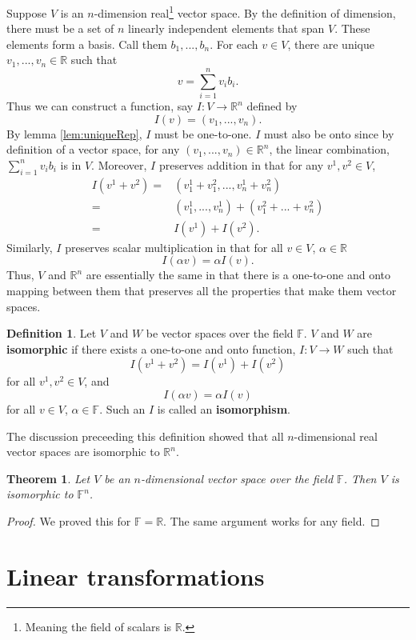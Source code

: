 \documentclass[12pt,reqno]{amsart}
\def\F{\mathbb{F}}
\def\R{\mathbb{R}}
\newtheorem{theorem}{Theorem}[section]
\theoremstyle{definition}
\newtheorem{definition}{Definition}[section]
\begin{document}
Suppose $V$ is an $n$-dimension real\footnote{Meaning the field of
  scalars is $\R$.} vector space. By the definition of dimension,
there must be a set of $n$ linearly independent elements that span
$V$. These elements form a basis. Call them $b_1, ..., b_n$. For each
$v \in V$, there are unique $v_1, ..., v_n \in \R$ such that 
\[ v = \sum_{i=1}^n v_i b_i. \]
Thus we can construct a function, say $I: V \to \R^n$ defined by 
\[ I(v) = (v_1, ..., v_n). \]
By lemma \ref{lem:uniqueRep}, $I$ must be one-to-one. $I$ must also be
onto since by definition of a vector space, for any $(v_1, ..., v_n)
\in \R^n$, the linear combination, $\sum_{i=1}^n v_i b_i$ is in
$V$. Moreover, $I$ preserves addition in that for
any $v^1, v^2 \in V$,
\begin{align*}
  I(v^1 + v^2) = & (v_1^1 + v_1^2, ..., v_n^1 + v_n^2) \\
  = & (v_1^1, ..., v_n^1) + (v_1^2 + ... + v_n^2) \\
  = & I(v^1) + I(v^2).
\end{align*}
Similarly, $I$ preserves scalar multiplication in that for all $v \in
V$, $\alpha \in \R$
\[ I(\alpha v) = \alpha I(v). \]
Thus, $V$ and $\R^n$ are essentially the same in that there is a
one-to-one and onto mapping between them that preserves all the
properties that make them vector spaces. 
\begin{definition}
  Let $V$ and $W$ be vector spaces over the field $\F$. $V$ and $W$ are
  \textbf{isomorphic} if there exists a one-to-one and onto function,
  $I:V \to W$ such that 
  \[ I(v^1 + v^2) = I(v^1) + I(v^2) \]
  for all $v^1, v^2 \in V$,
  and 
  \[ I(\alpha v) = \alpha I(v) \]
  for all $v \in V$, $\alpha \in \F$.
  Such an $I$ is called an \textbf{isomorphism}.
\end{definition}
The discussion preceeding this definition showed that all
$n$-dimensional real vector spaces are isomorphic to $\R^n$. 
\begin{theorem}
  Let $V$ be an $n$-dimensional vector space over the field $\F$. Then
  $V$ is isomorphic to $\F^n$. 
\end{theorem}
\begin{proof}
  We proved this for $\F=\R$. The same argument works for any field.
\end{proof}



\section{Linear transformations}
\end{document}
